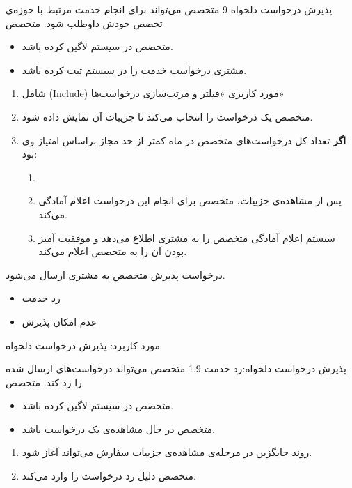{
\usecase
{پذیرش درخواست دلخواه}
{9}
{متخصص می‌تواند برای انجام خدمت مرتبط با حوزه‌ی تخصص خودش داوطلب شود.}
{متخصص}
{}
{	
	\begin{itemize}
		\vspace*{-0.6cm}
		\item 
		متخصص در سیستم لاگین کرده باشد.
		\item
		مشتری درخواست خدمت را در سیستم ثبت کرده باشد.
	\end{itemize}
}
{
	\vspace*{-0.6cm}
	\begin{enumerate}
		\item 
		شامل (Include) مورد کاربری «فیلتر و مرتب‌سازی درخواست‌ها»
		\item
		متخصص یک درخواست را انتخاب می‌کند تا جزییات آن نمایش داده شود.
		\item 
		\textbf{اگر} تعداد کل درخواست‌های متخصص در ماه کمتر از حد مجاز براساس امتیاز وی بود:
		\begin{enumerate}[label=\theenumi.\arabic*.]
			\item 
		
		\item
		پس از مشاهده‌ی جزییات، متخصص برای انجام این درخواست اعلام آمادگی می‌کند.
		\item
		سیستم اعلام آمادگی متخصص را به مشتری اطلاع می‌دهد و موفقیت آمیز بودن آن را به متخصص اعلام می‌کند.
		\end{enumerate}
	\end{enumerate}
}
{درخواست پذیرش متخصص به مشتری ارسال می‌شود.}
{
	\begin{itemize}
		\vspace*{-0.6cm}
		\item
		رد خدمت
		\item
		 عدم امکان پذیرش
	\end{itemize}
}
{
	مورد کاربرد: پذیرش درخواست دلخواه
}

\alternativeflow
{
	 پذیرش درخواست دلخواه:رد خدمت
}
{1.9}
{
	متخصص می‌تواند درخواست‌های ارسال شده را رد کند.
}
{
	متخصص
}
{}
{
	\begin{itemize}
		\vspace*{-0.6cm}
		\item 
		متخصص در سیستم لاگین کرده باشد.
		\item
		متخصص در حال مشاهده‌ی یک درخواست باشد.
	\end{itemize}
}
{
	\vspace*{-0.6cm}
	\begin{enumerate}
		\item 
		روند جایگزین در مرحله‌ی مشاهده‌ی جزییات سفارش می‌تواند آغاز شود.
		\item
		متخصص دلیل رد درخواست را وارد می‌کند.
		

\end{enumerate}}}
